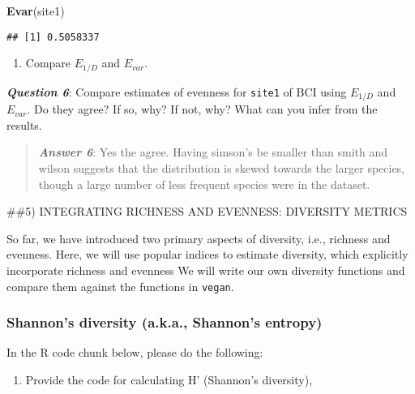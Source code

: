 \documentclass[
]{article}
\newenvironment{Shaded}{\begin{snugshade}}{\end{snugshade}}
\newcommand{\KeywordTok}[1]{\textcolor[rgb]{0.13,0.29,0.53}{\textbf{#1}}}
\newcommand{\NormalTok}[1]{#1}
\providecommand{\tightlist}{%
  \setlength{\itemsep}{0pt}\setlength{\parskip}{0pt}}
\begin{document}
\begin{Shaded}
\begin{Highlighting}[]
\KeywordTok{Evar}\NormalTok{(site1)}
\end{Highlighting}
\end{Shaded}

\begin{verbatim}
## [1] 0.5058337
\end{verbatim}

\begin{enumerate}
\def\labelenumi{\arabic{enumi}.}
\setcounter{enumi}{2}
\tightlist
\item
  Compare \(E_{1/D}\) and \(E_{var}\).
\end{enumerate}

\textbf{\emph{Question 6}}: Compare estimates of evenness for
\texttt{site1} of BCI using \(E_{1/D}\) and \(E_{var}\). Do they agree?
If so, why? If not, why? What can you infer from the results.

\begin{quote}
\textbf{\emph{Answer 6}}: Yes the agree. Having simson's be smaller than
smith and wilson suggests that the distribution is skewed towards the
larger species, though a large number of less frequent species were in
the dataset.
\end{quote}

\#\#5) INTEGRATING RICHNESS AND EVENNESS: DIVERSITY METRICS

So far, we have introduced two primary aspects of diversity, i.e.,
richness and evenness. Here, we will use popular indices to estimate
diversity, which explicitly incorporate richness and evenness We will
write our own diversity functions and compare them against the functions
in \texttt{vegan}.

\hypertarget{shannons-diversity-a.k.a.-shannons-entropy}{%
\subsubsection{Shannon's diversity (a.k.a., Shannon's
entropy)}\label{shannons-diversity-a.k.a.-shannons-entropy}}

In the R code chunk below, please do the following:

\begin{enumerate}
\def\labelenumi{\arabic{enumi}.}
\tightlist
\item
  Provide the code for calculating H' (Shannon's diversity),
\end{enumerate}
\end{document}
